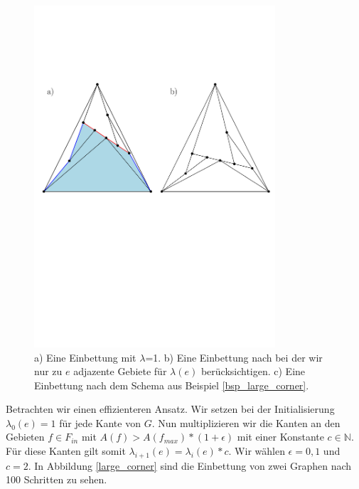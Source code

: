\begin{figure}
	\centering
  \includegraphics[width=0.8\textwidth]{example1_vis.pdf}
  \caption{a) Eine Einbettung mit $\lambda$=1. b) Eine Einbettung nach bei der wir nur zu $e$ adjazente Gebiete für $\lambda(e)$ berücksichtigen. c) Eine Einbettung nach dem Schema aus Beispiel \ref{bsp_large_corner}.}
  \label{long_segment}
\end{figure}

\begin{example}\label{bsp_large_corner}
Betrachten wir einen effizienteren Ansatz. Wir setzen bei der Initialisierung $\lambda_0(e)=1$ für jede Kante von $G$. Nun multiplizieren wir die Kanten an den Gebieten $f\in F_{in}$ mit $A(f) > A(f_{max})*(1+\epsilon)$ mit einer Konstante $c \in \mathbb{N}$. Für diese Kanten gilt somit $\lambda_{i+1}(e) = \lambda_{i}(e)*c$. Wir wählen $\epsilon = 0,1$ und $c=2$. In Abbildung \ref{large_corner} sind die Einbettung von zwei Graphen nach 100 Schritten zu sehen.
\end{example}

